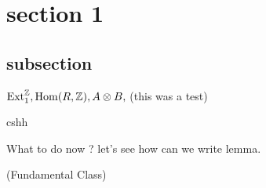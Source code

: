 \documentclass[11pt]{article}
\author{\textsc{Author name} \\[0.15cm]
  \href{https://www.isibang.ac.in}{Indian Statistical Institute, Bangalore}}
\date{}
\begin{document}
  \maketitle
 \abstract{\lipsum[0-1] }
\section{section 1}
 
\subsection{subsection} 
      \lipsum[1-1] $\operatorname{Ext}^{\mathbb{Z}}_1, \operatorname{Hom}({R},\mathbb{Z}), {A}\otimes {B},$ (this was a test) \les \es \ess \Qed

      \begin{Thm}{cshh}{}
             \lipsum[1-1]
      \end{Thm}

     \lipsum[1-1]

       \lipsum[2-2]
     
    \noindent What to do now ? let's see how can we write lemma. 

    \Lem{\lipsum[4-4]}

    \noindent \lipsum[5-5]

    \begin{Def}{(Fundamental Class) }{}
          \lipsum[5-5]
    \end{Def}
    
\end{document}
